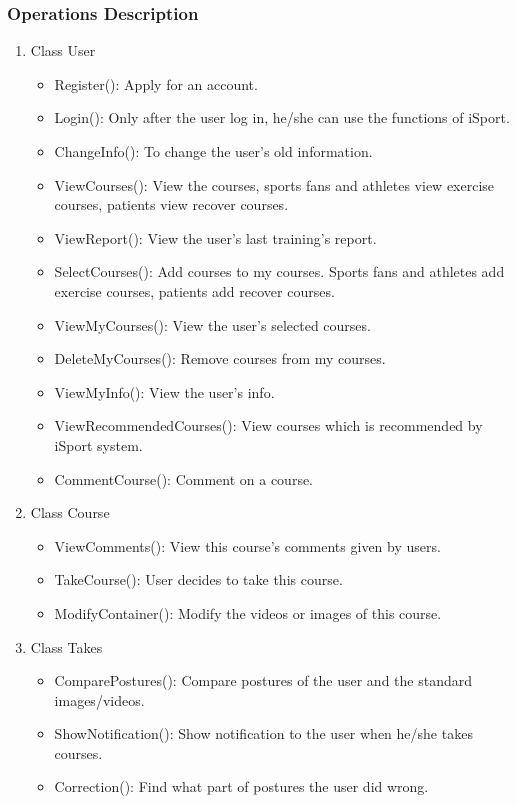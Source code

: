 \documentclass[16pt]{scrreprt}
\begin{document}
\subsubsection{Operations Description}
\begin{enumerate}
	\item Class User
	\begin{itemize}
		\item Register(): Apply for an account.
		\item Login(): Only after the user log in, he/she can use the functions of iSport.
		\item ChangeInfo(): To change the user's old information.
		\item ViewCourses(): View the courses, sports fans and athletes view exercise courses, patients view recover courses.
		\item ViewReport(): View the user's last training's report.
		\item SelectCourses(): Add courses to my courses. Sports fans and athletes add exercise courses, patients add recover courses.
		\item ViewMyCourses(): View the user's selected courses.
		\item DeleteMyCourses(): Remove courses from my courses.
		\item ViewMyInfo():  View the user's info.
		\item ViewRecommendedCourses(): View courses which is recommended by iSport system.
		\item CommentCourse(): Comment on a course.
	\end{itemize}
	\item Class Course
	\begin{itemize}
		\item ViewComments(): View this course's comments given by users.
		\item TakeCourse(): User decides to take this course.
		\item ModifyContainer(): Modify the videos or images of this course.
	\end{itemize}
	\item Class Takes
	\begin{itemize}
		\item ComparePostures(): Compare postures of the user and the standard images/videos.
		\item ShowNotification(): Show notification to the user when he/she takes courses.
		\item Correction(): Find what part of postures the user did wrong.

\end{itemize}
\end{enumerate}
\end{document}
